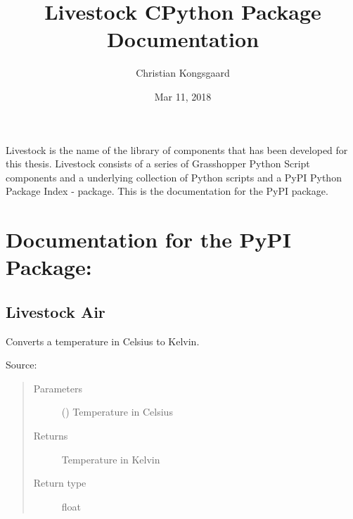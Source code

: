 \documentclass[letterpaper,10pt,english]{sphinxmanual}
\title{Livestock CPython Package Documentation}
\date{Mar 11, 2018}
\author{Christian Kongsgaard}
\begin{document}
\maketitle
\sphinxtableofcontents
{}\label{\detokenize{index::doc}}


Livestock is the name of the library of components that has been developed for this thesis.
Livestock consists of a series of Grasshopper Python Script components and a underlying collection of Python scripts
and a PyPI \textendash{} Python Package Index - package. This is the documentation for the PyPI package.


\chapter{Documentation for the PyPI Package:}
\label{\detokenize{index:documentation-for-the-pypi-package}}\label{\detokenize{index:welcome-to-livestock-cpython-package-s-documentation}}

\section{Livestock Air}
\label{\detokenize{air:livestock-air}}\label{\detokenize{air::doc}}\label{\detokenize{air:module-livestock.air}}

\begin{fulllineitems}
\label{\detokenize{air:livestock.air.celsius_to_kelvin}}
Converts a temperature in Celsius to Kelvin.

Source: 
\begin{quote}\begin{description}
\item[{Parameters}] \leavevmode
{} () \textendash{} Temperature in Celsius

\item[{Returns}] \leavevmode
Temperature in Kelvin

\item[{Return type}] \leavevmode
float

\end{description}\end{quote}

\end{fulllineitems}
\end{document}
